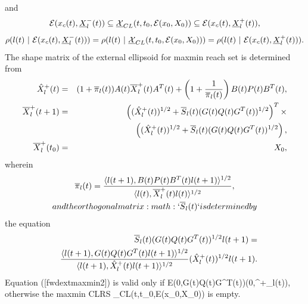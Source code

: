 \documentclass[letterpaper,10pt,english]{sphinxmanual}
\begin{document}
and
\begin{gather}
\begin{split}{\mathcal E}(x_c(t), \underline{X}^-_l(t))\subseteq\underline{{\mathcal X}}_{CL}(t,t_0,{\mathcal E}(x_0,X_0))
\subseteq {\mathcal E}(x_c(t), \underline{X}^+_l(t)),
\label{minmaxinclusion}\end{split}\notag
\end{gather}\begin{gather}
\begin{split}\rho(l(t) ~|~ {\mathcal E}(x_c(t), \underline{X}^-_l(t))) =
\rho(l(t) ~|~ \underline{{\mathcal X}}_{CL}(t, t_0, {\mathcal E}(x_0,X_0))) =
\rho(l(t) ~|~ {\mathcal E}(x_c(t), \underline{X}^+_l(t))) .
\label{minmaxtightness}\end{split}\notag
\end{gather}
The shape matrix of the external ellipsoid for maxmin reach set is
determined from
\begin{gather}
\begin{split}\begin{aligned}
\hat{X}^+_l(t) & = & (1+\overline{\pi}_l(t))A(t)\overline{X}^+_l(t)A^T(t) +
\left(1+\frac{1}{\overline{\pi}_l(t)}\right)
B(t)P(t)B^T(t), \label{fwdextmaxmin1} \\
\overline{X}^+_l(t+1) & = & \left((\hat{X}^+_l(t))^{1/2} +
\overline{S}_l(t)(G(t)Q(t)G^T(t))^{1/2}\right)^T
\times \nonumber \\
& &\left((\hat{X}^+_l(t))^{1/2} + \overline{S}_l(t)(G(t)Q(t)G^T(t))^{1/2}\right),
\label{fwdextmaxmin2}\\
\overline{X}^+_l(t_0) & = & X_0, \label{fwdextmaxmin3}\end{aligned}\end{split}\notag
\end{gather}
wherein
\begin{gather}
\begin{split}  \overline{\pi}_l(t) = \frac{\langle l(t+1),
  B(t)P(t)B^T(t)l(t+1)\rangle^{1/2}}{\langle l(t),
  \overline{X}^+_l(t)l(t)\rangle^{1/2}},\end{split}\notag\\\begin{split}and the orthogonal matrix :math:`\overline{S}_l(t)` is determined by\end{split}\notag
\end{gather}
the equation
\begin{gather}
\begin{split}\begin{aligned}
& & \overline{S}_l(t)(G(t)Q(t)G^T(t))^{1/2}l(t+1) = \\
& & \frac{\langle l(t+1),
G(t)Q(t)G^T(t)l(t+1)\rangle^{1/2}}{\langle l(t+1),
\hat{X}^+_l(t)l(t+1)\rangle^{1/2}}(\hat{X}^+_l(t))^{1/2}l(t+1).\end{aligned}\end{split}\notag
\end{gather}
Equation ({[}fwdextmaxmin2{]}) is valid only if
{\mathcal E}(0,G(t)Q(t)G^T(t))(0,^+_l(t)),
otherwise the maxmin CLRS
_{CL}(t,t_0,{\mathcal E}(x_0,X_0)) is
empty.
\end{document}
